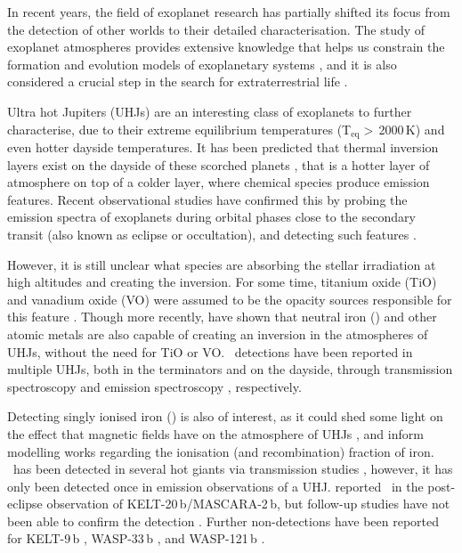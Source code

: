 \documentclass{aa}
\newcommand{\feI}{\ion{Fe}{i}}
\newcommand{\feII}{\ion{Fe}{ii}}
\begin{document}
In recent years, the field of exoplanet research has partially shifted its focus from the detection of other worlds to their detailed characterisation. The study of exoplanet atmospheres provides extensive knowledge that helps us constrain the formation and evolution models of exoplanetary systems \citep[e.g.][]{madhusudhan2019}, and it is also considered a crucial step in the search for extraterrestrial life \citep[e.g.][]{schwieterman2018, meadows2018}.

Ultra hot Jupiters (UHJs) are an interesting class of exoplanets to further characterise, due to their extreme equilibrium temperatures (T$_\mathrm{eq}>$\,2000\,K) and even hotter dayside temperatures. It has been predicted that thermal inversion layers exist on the dayside of these scorched planets \citep[e.g.][]{lothringer2018, lothringer2019}, that is a hotter layer of atmosphere on top of a colder layer, where chemical species produce emission features. Recent observational studies have confirmed this by probing the emission spectra of exoplanets during orbital phases close to the secondary transit (also known as eclipse or occultation), and detecting such features \citep[e.g.][]{evans2017, yan2020, borsa2022, changeat2022}.

However, it is still unclear what species are absorbing the stellar irradiation at high altitudes and creating the inversion. For some time, titanium oxide (TiO) and vanadium oxide (VO) were assumed to be the opacity sources responsible for this feature \citep{hubeny2003, fortney2008}. Though more recently, \citet{lothringer2018} have shown that neutral iron (\feI) and other atomic metals are also capable of creating an inversion in the atmospheres of UHJs, without the need for TiO or VO. \feI\ detections have been reported in multiple UHJs, both in the terminators and on the dayside, through transmission spectroscopy \citep[e.g.][]{hoeijmakers2018, ehrenreich2020, bourrier2020, borsa2021} and emission spectroscopy \citep[e.g.][]{pino2020, scandariato2023}, respectively. 

Detecting singly ionised iron (\feII) is also of interest, as it could shed some light on the effect that magnetic fields have on the atmosphere of UHJs \citep[e.g.][]{perna2010}, and inform modelling works regarding the ionisation (and recombination) fraction of iron. \feII\ has been detected in several hot giants via transmission studies \citep[e.g.][]{hoeijmakers2019, borsa2021, prinoth2022, belloarufe2022}, however, it has only been detected once in emission observations of a UHJ. \citet{borsa2021} reported \feII\ in the post-eclipse observation of KELT-20\,b/MASCARA-2\,b, but follow-up studies have not been able to confirm the detection \citep{yan2022, kasper2023, petz2024}. Further non-detections have been reported for KELT-9\,b \citep{pino2020, riddenharper2023}, WASP-33\,b \citep{cont2022}, and WASP-121\,b \citep{hoeijmakers2024}.
\end{document}
